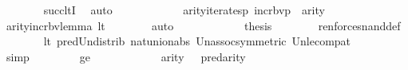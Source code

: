 \begin{isabellebody}
\ \ \ \ \ \ \isamarkupfalse%
\ succ{\isacharunderscore}{\kern0pt}ltI\ \isamarkupfalse%
\ auto\isanewline
\ \ \ \ \isamarkupfalse%
\ {\isacartoucheopen}{\isasymphi}{\isasymin}{\isacharunderscore}{\kern0pt}{\isacartoucheclose}\isanewline
\ \ \ \ \isamarkupfalse%
\ {\isachardoublequoteopen}arity{\isacharparenleft}{\kern0pt}iterates{\isacharparenleft}{\kern0pt}{\isasymlambda}p{\isachardot}{\kern0pt}\ incr{\isacharunderscore}{\kern0pt}bv{\isacharparenleft}{\kern0pt}p{\isacharparenright}{\kern0pt}{\isacharbackquote}{\kern0pt}{}{\isacharcomma}{\kern0pt}{}{\isacharcomma}{\kern0pt}{\isasymphi}{\isacharparenright}{\kern0pt}{\isacharparenright}{\kern0pt}\ {\isacharequal}{\kern0pt}\ {}{\isacharhash}{\kern0pt}{\isacharplus}{\kern0pt}arity{\isacharparenleft}{\kern0pt}{\isasymphi}{\isacharparenright}{\kern0pt}{\isachardoublequoteclose}\isanewline
\ \ \ \ \ \ \isamarkupfalse%
\ arity{\isacharunderscore}{\kern0pt}incr{\isacharunderscore}{\kern0pt}bv{\isacharunderscore}{\kern0pt}lemma\ lt\isanewline
\ \ \ \ \ \ \isamarkupfalse%
\ auto\isanewline
\ \ \ \ \isamarkupfalse%
\ {\isacartoucheopen}{\isasymphi}{\isasymin}{\isacharunderscore}{\kern0pt}{\isacartoucheclose}\isanewline
\ \ \ \ \isamarkupfalse%
\ {\isacharquery}{\kern0pt}thesis\isanewline
\ \ \ \ \ \ \isamarkupfalse%
\ ren{\isacharunderscore}{\kern0pt}forces{\isacharunderscore}{\kern0pt}nand{\isacharunderscore}{\kern0pt}def\isanewline
\ \ \ \ \ \ \isamarkupfalse%
\ lt\ pred{\isacharunderscore}{\kern0pt}Un{\isacharunderscore}{\kern0pt}distrib\ nat{\isacharunderscore}{\kern0pt}union{\isacharunderscore}{\kern0pt}abs{}\ Un{\isacharunderscore}{\kern0pt}assoc{\isacharbrackleft}{\kern0pt}symmetric{\isacharbrackright}{\kern0pt}\ Un{\isacharunderscore}{\kern0pt}le{\isacharunderscore}{\kern0pt}compat\isanewline
\ \ \ \ \ \ \isamarkupfalse%
\ simp\isanewline
\ \ \isamarkupfalse%
\isanewline
\ \ \ \ \isamarkupfalse%
\ ge\isanewline
\ \ \ \ \isamarkupfalse%
\ {\isacartoucheopen}{\isasymphi}{\isasymin}{\isacharunderscore}{\kern0pt}{\isacartoucheclose}\isanewline
\ \ \ \ \isamarkupfalse%
\ {\isachardoublequoteopen}arity{\isacharparenleft}{\kern0pt}{\isasymphi}{\isacharparenright}{\kern0pt}\ {\isasymle}\ {}{\isachardoublequoteclose}\ {\isachardoublequoteopen}pred{\isacharparenleft}{\kern0pt}arity{\isacharparenleft}{\kern0pt}{\isasymphi}{\isacharparenright}{\kern0pt}{\isacharparenright}{\kern0pt}\ {\isasymle}\ {}{\isachardoublequoteclose}\isanewline

\end{isabellebody}
